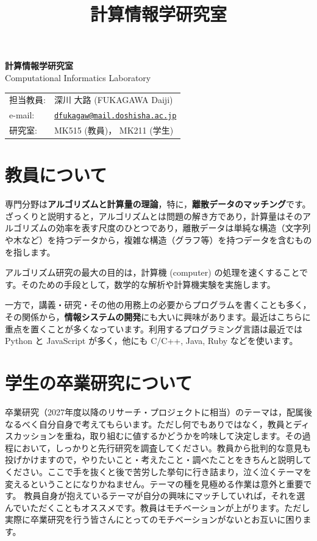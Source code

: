 \documentclass[paper=a4paper,fontsize=10.4pt]{jlreq}
\title{計算情報学研究室}
\date{}
\renewcommand{\emph}[1]{\textbf{#1}}
\begin{document}
\begin{minipage}[t]{.45\textwidth}
\noindent
{\LARGE\bfseries{} 計算情報学研究室}\\
\hspace{.4cm} Computational Informatics Laboratory
\end{minipage}
\begin{minipage}[t]{.45\textwidth}
\begin{tabular}{l@{ }l}
担当教員: & 深川 大路 (FUKAGAWA Daiji) \\
e-mail: & \href{mailto:dfukagaw@mail.doshisha.ac.jp}{\texttt{dfukagaw@mail.doshisha.ac.jp}} \\
研究室: & MK515 (教員)， MK211 (学生)
\end{tabular}
\end{minipage}


\section{教員について}

専門分野は\emph{アルゴリズムと計算量の理論}，特に，\emph{離散データのマッチング}です。
ざっくりと説明すると，アルゴリズムとは問題の解き方であり，計算量はそのアルゴリズムの効率を表す尺度のひとつであり，離散データは単純な構造（文字列や木など）を持つデータから，複雑な構造（グラフ等）を持つデータを含むものを指します。

アルゴリズム研究の最大の目的は，計算機 (computer) の処理を速くすることです。そのための手段として，数学的な解析や計算機実験を実施します。

一方で，講義・研究・その他の用務上の必要からプログラムを書くことも多く，その関係から，\emph{情報システムの開発}にも大いに興味があります。最近はこちらに重点を置くことが多くなっています。利用するプログラミング言語は最近では Python と JavaScript が多く，他にも C/C++, Java, Ruby などを使います。

\section{学生の卒業研究について}

卒業研究（2027年度以降のリサーチ・プロジェクトに相当）のテーマは，配属後なるべく自分自身で考えてもらいます。ただし何でもありではなく，教員とディスカッションを重ね，取り組むに値するかどうかを吟味して決定します。その過程において，しっかりと先行研究を調査してください。教員から批判的な意見も投げかけますので，やりたいこと・考えたこと・調べたことをきちんと説明してください。ここで手を抜くと後で苦労した挙句に行き詰まり，泣く泣くテーマを変えるということになりかねません。テーマの種を見極める作業は意外と重要です。
教員自身が抱えているテーマが自分の興味にマッチしていれば，それを選んでいただくこともオススメです。教員はモチベーションが上がります。ただし実際に卒業研究を行う皆さんにとってのモチベーションがないとお互いに困ります。
\end{document}
